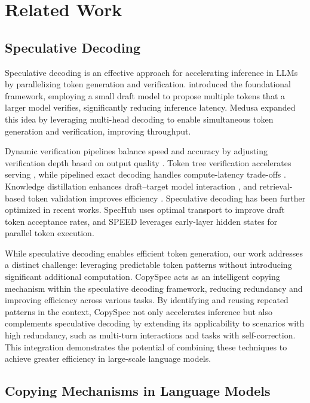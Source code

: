\section{Related Work}
\subsection{Speculative Decoding}

Speculative decoding is an effective approach for accelerating inference in LLMs by parallelizing token generation and verification. \citet{leviathan2023speculative} introduced the foundational framework, employing a small draft model to propose multiple tokens that a larger model verifies, significantly reducing inference latency. Medusa \cite{cai2024medusa} expanded this idea by leveraging multi-head decoding to enable simultaneous token generation and verification, improving throughput. 

Dynamic verification pipelines balance speed and accuracy by adjusting verification depth based on output quality \cite{liu2024adaptive}. Token tree verification accelerates serving \cite{specinfer2023}, while pipelined exact decoding handles compute-latency trade-offs \cite{predictive2023pipelined}. Knowledge distillation enhances draft–target model interaction \cite{distillspec2023}, and retrieval-based token validation improves efficiency \cite{rest2023retrievalaugmented}. Speculative decoding has been further optimized in recent works. SpecHub \cite{sun2024spechubprovableaccelerationmultidraft} uses optimal transport to improve draft token acceptance rates, and SPEED \cite{he2023speed} leverages early-layer hidden states for parallel token execution.

While speculative decoding enables efficient token generation, our work addresses a distinct challenge: leveraging predictable token patterns without introducing significant additional computation. CopySpec acts as an intelligent copying mechanism within the speculative decoding framework, reducing redundancy and improving efficiency across various tasks. By identifying and reusing repeated patterns in the context, CopySpec not only accelerates inference but also complements speculative decoding by extending its applicability to scenarios with high redundancy, such as multi-turn interactions and tasks with self-correction. This integration demonstrates the potential of combining these techniques to achieve greater efficiency in large-scale language models.

\subsection{Copying Mechanisms in Language Models}


